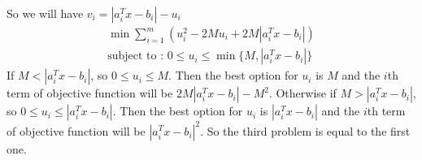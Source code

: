 \begin{latin}
\begin{itemize}
\begin{enumerate}
\end{enumerate}
So we will have $ v_{i} = |a^{T}_{i} x - b_{i}| - u_{i} $
\begin{gather*}
	\min \sum_{i=1}^{m}(u^{2}_{i} - 2Mu_{i} + 2M|a^{T}_{i} x - b_{i}|)
	\\
	\text{subject to : } 0 \leq u_{i} \leq \min \{M, |a^{T}_{i}x- b_{i}|\}
\end{gather*}
If $ M < |a^{T}_{i}x- b_{i}| $, so $  0 \leq u_{i} \leq M $. Then the best option for $ u_{i} $ is $ M $ and the $ i $th term of objective function will be 
$ 2M|a^{T}_{i} x - b_{i}|-M^{2} $.
Otherwise if $ M > |a^{T}_{i}x- b_{i}| $, so $  0 \leq u_{i} \leq |a^{T}_{i}x- b_{i}| $. Then the best option for $ u_{i} $ is $ |a^{T}_{i}x- b_{i}| $ and the $ i $th term of objective function will be $|a^{T}_{i} x - b_{i}|^{2}$.
So the third problem is equal to the first one.
\end{itemize}

\end{latin}